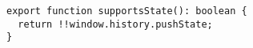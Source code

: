 \begin{verbatim}
export function supportsState(): boolean {
  return !!window.history.pushState;
}
\end{verbatim}
